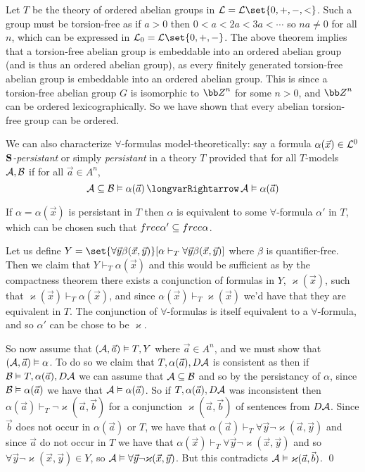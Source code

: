 \bexam

    Let $T$ be the theory of ordered abelian groups in ${\cal L}={\cal L}\set{0,+,-,<}$.
    Such a group must be torsion-free as if $a>0$ then $0<a<2a<3a<\cdots$ so $na\neq0$ for all $n$, which can be expressed in ${\cal L}_0={\cal L}\set{0,+,-}$.
    The above theorem implies that a torsion-free abelian group is embeddable into an ordered abelian group (and is thus an ordered abelian group), as every finitely generated torsion-free abelian group
    is embeddable into an ordered abelian group.
    This is since a torsion-free abelian group $G$ is isomorphic to ${\bb Z}^n$ for some $n>0$, and ${\bb Z}^n$ can be ordered lexicographically.
    So we have shown that every abelian torsion-free group can be ordered.

\eexam

We can also characterize $\forall$-formulas model-theoretically: say a formula $\alpha(\vec x)\in{\cal L}^0$ {\it ${\bf S}$-persistant} or simply {\it persistant}
in a theory $T$ provided that for all $T$-models ${\cal A},{\cal B}$ if for all $\vec a\in A^n$,
$$ {\cal A}\subseteq{\cal B}\vDash\alpha(\vec a)\implies {\cal A}\vDash\alpha(\vec a) $$

\bthrm

    If $\alpha=\alpha(\vec x)$ is persistant in $T$ then $\alpha$ is equivalent to some $\forall$-formula $\alpha'$ in $T$, which can be chosen such that ${\sl free}\alpha'\subseteq{\sl free}\alpha$.

\ethrm

Let us define $Y=\set{\forall\vec y\beta(\vec x,\vec y)}[\alpha\vdash_T\forall\vec y\beta(\vec x,\vec y)]$ where $\beta$ is quantifier-free.
Then we claim that $Y\vdash_T\alpha(\vec x)$ and this would be sufficient as by the compactness theorem there exists a conjunction of formulas in $Y$, $\varkappa(\vec x)$, such that
$\varkappa(\vec x)\vdash_T\alpha(\vec x)$, and since $\alpha(\vec x)\vdash_T\varkappa(\vec x)$ we'd have that they are equivalent in $T$.
The conjunction of $\forall$-formulas is itself equivalent to a $\forall$-formula, and so $\alpha'$ can be chose to be $\varkappa$.

So now assume that $({\cal A},\vec a)\vDash T,Y$ where $\vec a\in A^n$, and we must show that $({\cal A},\vec a)\vDash\alpha$.
To do so we claim that $T,\alpha(\vec a),D{\cal A}$ is consistent as then if ${\cal B}\vDash T,\alpha(\vec a),D{\cal A}$ we can assume that ${\cal A}\subseteq{\cal B}$ and so by the persistancy of $\alpha$,
since ${\cal B}\vDash\alpha(\vec a)$ we have that ${\cal A}\vDash\alpha(\vec a)$.
So if $T,\alpha(\vec a),D{\cal A}$ was inconsistent then $\alpha(\vec a)\vdash_T\neg\varkappa(\vec a,\vec b)$ for a conjunction $\varkappa(\vec a,\vec b)$ of sentences from $D{\cal A}$.
Since $\vec b$ does not occur in $\alpha(\vec a)$ or $T$, we have that $\alpha(\vec a)\vdash_T\forall\vec y\neg\varkappa(\vec a,\vec y)$ and since $\vec a$ do not occur in $T$ we have that
$\alpha(\vec x)\vdash_T\forall\vec y\neg\varkappa(\vec x,\vec y)$ and so $\forall\vec y\neg\varkappa(\vec x,\vec y)\in Y$, so ${\cal A}\vDash\forall\vec y\neg\varkappa(\vec x,\vec y)$.
But this contradicts ${\cal A}\vDash\varkappa(\vec a,\vec b)$.
\qed

